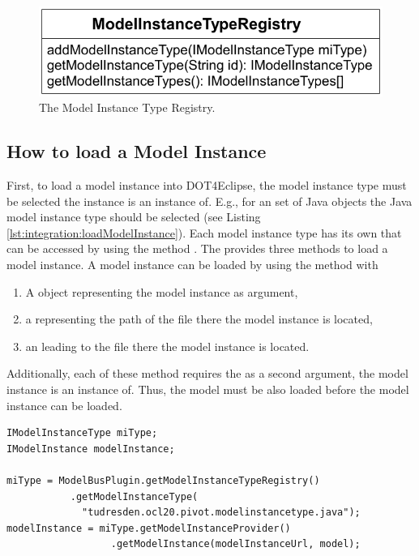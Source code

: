\begin{figure}[!b]
	\centering
	\includegraphics[width=.7\linewidth]{figures/integration/modelInstanceTypeRegistry}
	\caption{The Model Instance Type Registry.}
	\label{pic:integration:modelInstanceTypeRegistry}
\end{figure}


\subsection{How to load a Model Instance}

First, to load a model instance into \acl{DOT4Eclipse}, the model instance type must be selected the instance is an instance of. E.g., for an set of Java objects the Java model instance type should be selected (see Listing \ref{lst:integration:loadModelInstance}). Each model instance type has its own  that can be accessed by using the method . The  provides three methods to load a model instance. A model instance can be loaded by using the method  with

\begin{enumerate}
	\item A  object representing the model instance as argument,
	\item a  representing the path of the file there the model instance is located,
	\item an  leading to the file there the model instance is located.
\end{enumerate}

Additionally, each of these method requires the  as a second argument, the model instance is an instance of. Thus, the model must be also loaded before the model instance can be loaded.

\lstset{
  language=Java
}
\begin{lstlisting}[caption={How to load a model instance.}, captionpos=b, label=lst:integration:loadModelInstance, float]
IModelInstanceType miType;
IModelInstance modelInstance;

miType = ModelBusPlugin.getModelInstanceTypeRegistry()
           .getModelInstanceType(
             "tudresden.ocl20.pivot.modelinstancetype.java");
modelInstance = miType.getModelInstanceProvider()
                  .getModelInstance(modelInstanceUrl, model);
\end{lstlisting}

